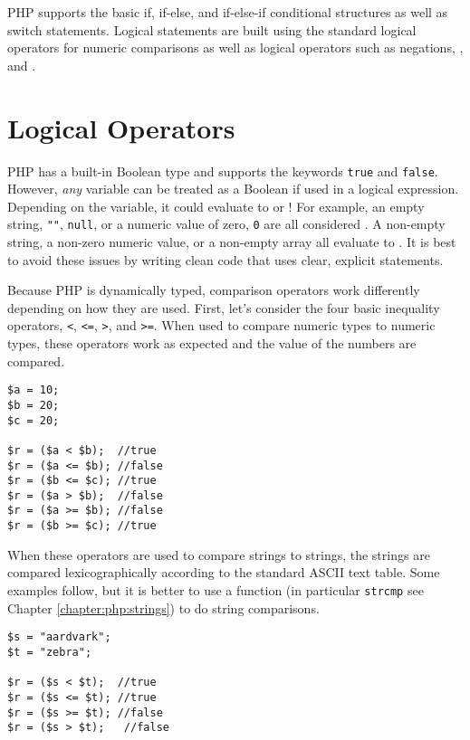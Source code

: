 

PHP supports the basic if, if-else, and if-else-if conditional structures as well as switch
statements.  Logical statements are built using the standard logical operators for
numeric comparisons as well as logical operators such as negations, \And, and 
\Or.

\section{Logical Operators}

PHP has a built-in Boolean type and supports the keywords \texttt{true}
and \texttt{false}.  However, \emph{any} variable can be treated as a 
Boolean if used in a logical expression.  Depending on the variable, it could
evaluate to \True or \False!  For example, an empty string, \texttt{""},
\texttt{null}, or a numeric value of zero, \texttt{0} are all
considered \False.  A non-empty string, a non-zero numeric value, or a
non-empty array all evaluate to \True.  It is best to avoid these issues by 
writing clean code that uses clear, explicit statements.

Because PHP is dynamically typed, comparison operators work differently 
depending on how they are used.  First, let's consider the four basic 
inequality operators, \texttt{<},  \texttt{<=},  \texttt{>},  
and \texttt{>=}.  When used to compare numeric types
to numeric types, these operators work as expected and the value of 
the numbers are compared.

\begin{verbatim}
$a = 10;
$b = 20;
$c = 20;

$r = ($a < $b);  //true
$r = ($a <= $b); //false
$r = ($b <= $c); //true
$r = ($a > $b);  //false
$r = ($a >= $b); //false
$r = ($b >= $c); //true
\end{verbatim}

When these operators are used to compare strings to strings, the strings
are compared lexicographically according to the standard ASCII text table.
Some examples follow, but it is better to use a function (in particular 
\texttt{strcmp} see Chapter \ref{chapter:php:strings}) to do 
string comparisons.

\begin{verbatim}
$s = "aardvark";
$t = "zebra";

$r = ($s < $t);  //true
$r = ($s <= $t); //true
$r = ($s >= $t); //false
$r = ($s > $t);   //false
\end{verbatim}

